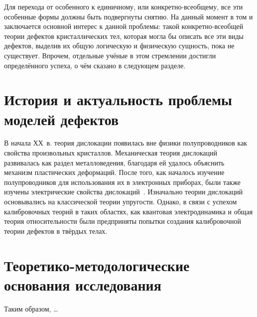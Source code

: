 \documentclass[a4paper, 14pt, titlepage]{extarticle}
\begin{document}
  Для перехода от особенного к единичному, или конкретно-всеобщему, все эти особенные формы должны
  быть подвергнуты снятию. На данный момент в том и заключается основной интерес к данной проблемы:
  такой конкретно-всеобщей теории дефектов кристаллических тел, которая могла бы описать все эти
  виды дефектов, выделив их общую логическую и физическую сущность, пока не существует. Впрочем,
  отдельные учёные в этом стремлении достигли определённого успеха, о чём сказано в следующем разделе.

  \section{История и актуальность проблемы моделей дефектов}

  В начала ХХ~в. теория дислокации появилась вне физики полупроводников как свойства произвольных
  кристаллов. Механическая теория дислокаций развивалась как раздел металловедения, благодаря ей
  удалось объяснить механизм пластических деформаций. После того, как началось изучение
  полупроводников для использования их в электронных приборах, были также изучены электрические
  свойства дислокаций~\cite{matare-defects}. Изначально теории дислокаций основывались на
  классической теории упругости. Однако, в связи с успехом калибровочных теорий в таких областях,
  как квантовая электродинамика и общая теория относительности были предприняты попытки создания
  калибровочной теории дефектов в твёрдых телах.

  \section{Теоретико-методологические основания исследования}


  Таким образом, \dots

  \PrintBibliography
\end{document}
